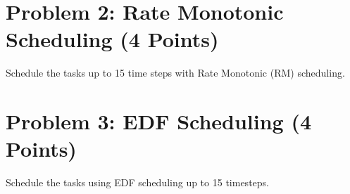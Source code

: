 \documentclass[11pt,letterpaper]{article}
\begin{document}
	\section*{Problem 2: Rate Monotonic Scheduling (4 Points)}
	
	Schedule the tasks up to 15 time steps with Rate Monotonic (RM) scheduling.
	
	\begin{figure}[h]
		\centering
	\end{figure}
	
	\newpage
	\section*{Problem 3: EDF Scheduling (4 Points)}
	
	Schedule the tasks using EDF scheduling up to 15 timesteps.
	
	
	\begin{figure}[h]
		\centering
	\end{figure}
	
\end{document}
